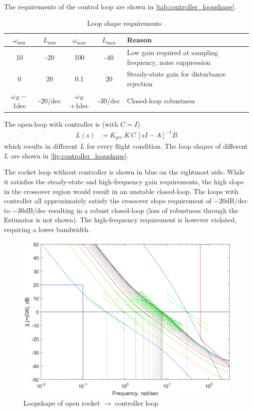 The requirements of the control loop are shown in \autoref{tab:controller_loopshape}.
\begin{table}[ht]
    \centering
    \begin{tabularx}{\linewidth}{c c | c c | X }
         $\omega_\text{min}$ & $L_\text{min}$ & $\omega_\text{max}$ & $L_\text{max}$ & Reason \\
         \hline
         10 & -20 & 100 & -40 & Low gain required at sampling frequency, noise suppression \\
         0 & 20 & 0.1 & 20 & Steady-state gain for disturbance rejection \\
         $\omega_B-$1dec & -20/dec & $\omega_B$+1dec & -30/dec & Closed-loop robustness
    \end{tabularx}
    \caption{Loop shape requirements \cite{theis2023}.}
    \label{tab:controller_loopshape}
\end{table}

The open-loop with controller is (with $C=I$) 
\begin{align}
    L(s) &=  K_{pre}\,  K \, C \, \left[sI- A\right]^{-1} B
\end{align}
which results in different $L$ for every flight condition.
The loop shapes of different $L$ are shown in \autoref{fig:controller_loopshape}.

The rocket loop without controller is shown in blue on the rightmost side. 
While it satisfies the steady-state and high-frequency gain requirements, the high slope in the crossover region would result in an unstable closed-loop.
The loops with controller all approximately satisfy the crossover slope requirement of $-20$dB/dec to $-30$dB/dec resulting in a robust closed-loop (loss of robustness through the Estimator is not shown). 
The high-frequency requirement is however violated, requiring a lower bandwidth.

\begin{figure}[ht]
    \centering
    \includegraphics[width=0.7\linewidth]{images-design/controller_loopshape.png}
    \caption{Loopshape of open rocket $\to$ controller loop}
    \label{fig:controller_loopshape}
\end{figure}




